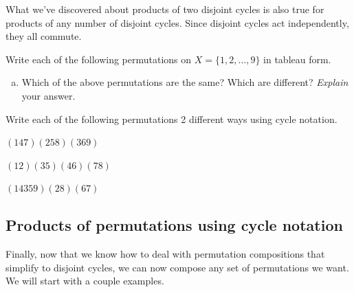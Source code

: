 \noindent
What we've discovered about products of two disjoint cycles is also true for products of any number of disjoint cycles. Since disjoint cycles act independently, they all commute.

\begin{exercise}{}
Write each of the following permutations on $X = \{1,2,\ldots,9\}$ in tableau form.
\begin{enumerate}[(a)]
\item
Which of the above permutations are the same? Which are different? \emph{Explain} your answer.
\end{enumerate}
\end{exercise}

\begin{exercise}{}
Write each of the following permutations 2 different ways using cycle notation.
\begin{enumerate}[(a)]
\begin{multicols}{3}
\item
$(147)(258)(369)$
\item
$(12)(35)(46)(78)$
\item
$(14359)(28)(67)$
\end{multicols}
\end{enumerate}
\end{exercise}


\subsection{Products of permutations using cycle notation}
Finally, now that we know how to deal with permutation compositions that simplify to disjoint cycles, we can now compose any set of permutations we want.  We will start with a couple examples.

